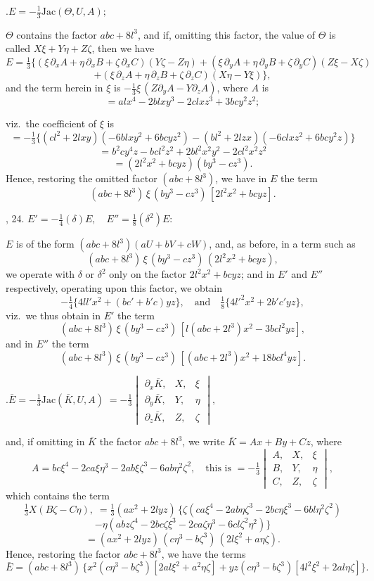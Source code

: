 \documentclass[11pt,a4paper]{article}
\begin{document}
\medskip{}.\quad $E=-\tfrac{1}{3}\mathrm{Jac}(\Theta,U,A);$

$\Theta$ contains the factor $abc+8l^{3}$, and if, omitting this factor, the value of $\Theta$ is called $X\xi+Y\eta+Z\zeta$, then we have
\[
  E=\tfrac{1}{3}\{(\xi\,\partial_{x}A+\eta\,\partial_{x}B+\zeta\,\partial_{x}C)(Y\zeta-Z\eta)+(\xi\,\partial_{y}A+\eta\,\partial_{y}B+\zeta\,\partial_{y}C)(Z\xi-X\zeta)
\]
\[
  +(\xi\,\partial_{z}A+\eta\,\partial_{z}B+\zeta\,\partial_{z}C)(X\eta-Y\xi)\},
\]
and the term herein in $\xi$ is $-\tfrac{1}{3}\xi\,(Z\partial_{y}A-Y\partial_{z}A)$, where $A$ is
\[
  =alx^{4}-2blxy^{3}-2clxz^{3}+3bcy^{2}z^{2};
\]

\newpage
\noindent
viz.\ the coefficient of $\xi$ is
\[
  =-\tfrac{1}{3}\{(cl^{2}+2lxy)(-6blxy^{2}+6bcyz^{2})-(bl^{2}+2lzx)(-6clxz^{2}+6bcy^{2}z)\}
\]
\[
  =b^{2}cy^{4}z-bcl^{2}z^{2}+2bl^{2}x^{2}y^{2}-2cl^{2}x^{2}z^{2}
\]
\[
  =(2l^{2}x^{2}+bcyz)(by^{3}-cz^{3}).
\]
Hence, restoring the omitted factor $(abc+8l^{3})$, we have in $E$ the term
\[
  (abc+8l^{3})\,\xi\,(by^{3}-cz^{3})\,[2l^{2}x^{2}+bcyz].
\]

\medskip{}, 24. \quad $E'=-\tfrac{1}{4}(\delta)E,\quad E''=\tfrac{1}{8}(\delta^{2})E:$

$E$ is of the form $(abc+8l^{3})(aU+bV+cW)$, and, as before, in a term such as
\[
  (abc+8l^{3})\,\xi\,(by^{3}-cz^{3})\,(2l^{2}x^{2}+bcyz),
\]
we operate with $\delta$ or $\delta^{2}$ only on the factor $2l^{2}x^{2}+bcyz$; and in $E'$ and $E''$ respectively, operating upon this factor, we obtain
\[
  -\tfrac{1}{4}\{4ll'x^{2}+(bc'+b'c)yz\},\quad\text{and}\quad \tfrac{1}{8}\{4l'^{2}x^{2}+2b'c'yz\},
\]
viz.\ we thus obtain in $E'$ the term
\[
  (abc+8l^{3})\,\xi\,(by^{3}-cz^{3})\,[l(abc+2l^{3})x^{2}-3bcl^{2}yz],
\]
and in $E''$ the term
\[
  (abc+8l^{3})\,\xi\,(by^{3}-cz^{3})\,[(abc+2l^{3})x^{2}+18bcl^{4}yz].
\]

\medskip{}.\quad $\bar E=-\tfrac{1}{3}\mathrm{Jac}(\bar K,U,A)\;=-\tfrac{1}{3}\begin{vmatrix}\partial_{x}\bar K,&X,&\xi\\ \partial_{y}\bar K,&Y,&\eta\\ \partial_{z}\bar K,&Z,&\zeta\end{vmatrix},$

and, if omitting in $\bar K$ the factor $abc+8l^{3}$, we write $\bar K=Ax+By+Cz$, where
\[
  A=bc\xi^{4}-2ca\xi\eta^{3}-2ab\xi\zeta^{3}-6ab\eta^{2}\zeta^{2},\quad\text{this is }=-\tfrac{1}{3}\begin{vmatrix}A,&X,&\xi\\B,&Y,&\eta\\C,&Z,&\zeta\end{vmatrix},
\]
which contains the term
\[
  \tfrac{1}{3}X(B\zeta-C\eta),\;=\tfrac{1}{3}(ax^{2}+2lyz)\,\{\zeta(ca\xi^{4}-2ab\eta\zeta^{3}-2bc\eta\xi^{3}-6bl\eta^{2}\zeta^{2})
\]
\[
  -\eta(abz\zeta^{4}-2bc\zeta\xi^{3}-2ca\zeta\eta^{3}-6cl\zeta^{2}\eta^{2})\}
\]
\[
  =(ax^{2}+2lyz)\,(c\eta^{3}-b\zeta^{3})\,(2l\xi^{2}+a\eta\zeta).
\]
Hence, restoring the factor $abc+8l^{3}$, we have the terms
\[
  \bar E=(abc+8l^{3})\,\{x^{2}(c\eta^{3}-b\zeta^{3})[2al\xi^{2}+a^{2}\eta\zeta]+yz(c\eta^{3}-b\zeta^{3})[4l^{2}\xi^{2}+2al\eta\zeta]\}.
\]
\end{document}
